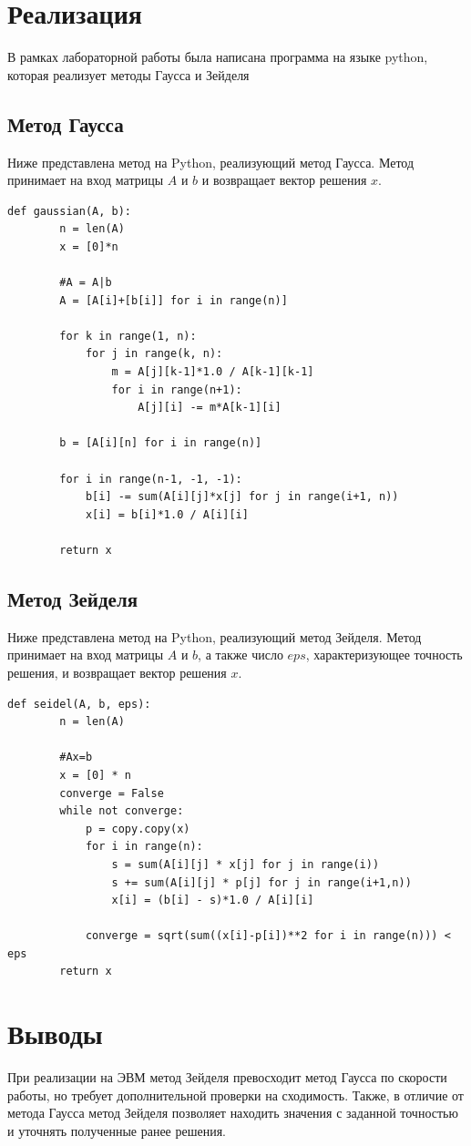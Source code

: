 \documentclass[12pt,a4paper,oneside]{extarticle}
\begin{document}
\section{Реализация}
    В рамках лабораторной работы была написана программа на языке python, которая реализует методы Гаусса и Зейделя

    \subsection{Метод Гаусса}
    Ниже представлена метод на Python, реализующий метод Гаусса. Метод принимает на вход матрицы $A$ и $b$ и возвращает вектор решения $x$.
    \lstset{language=Python}
        \begin{lstlisting}[mathescape] 
    def gaussian(A, b):
        n = len(A)    
        x = [0]*n

        #A = A|b
        A = [A[i]+[b[i]] for i in range(n)]

        for k in range(1, n):
            for j in range(k, n):
                m = A[j][k-1]*1.0 / A[k-1][k-1]
                for i in range(n+1):
                    A[j][i] -= m*A[k-1][i]

        b = [A[i][n] for i in range(n)]

        for i in range(n-1, -1, -1):
            b[i] -= sum(A[i][j]*x[j] for j in range(i+1, n))
            x[i] = b[i]*1.0 / A[i][i]
     
        return x
    \end{lstlisting}

    \subsection{Метод Зейделя}
    Ниже представлена метод на Python, реализующий метод Зейделя. Метод принимает на вход матрицы $A$ и $b$, а также число $eps$, характеризующее точность решения, и возвращает вектор решения $x$.

    \lstset{language=Python}
        \begin{lstlisting}[mathescape] 
    def seidel(A, b, eps):
        n = len(A)

        #Ax=b    
        x = [0] * n
        converge = False
        while not converge:
            p = copy.copy(x)
            for i in range(n):
                s = sum(A[i][j] * x[j] for j in range(i))
                s += sum(A[i][j] * p[j] for j in range(i+1,n))
                x[i] = (b[i] - s)*1.0 / A[i][i]
     
            converge = sqrt(sum((x[i]-p[i])**2 for i in range(n))) < eps
        return x
    \end{lstlisting}

\section{Выводы}
    При реализации на ЭВМ метод Зейделя превосходит метод Гаусса по скорости работы, но требует дополнительной проверки на сходимость. Также, в отличие от метода Гаусса метод Зейделя позволяет находить значения с заданной точностью и уточнять полученные ранее решения.    
\end{document}
